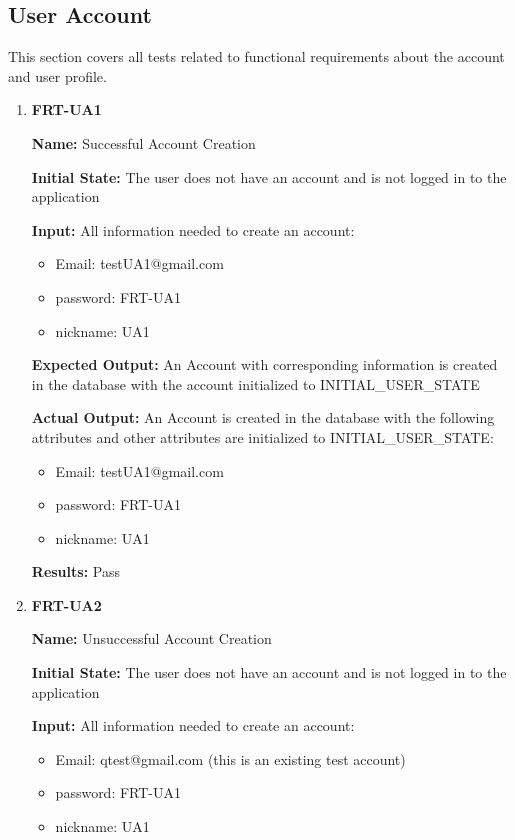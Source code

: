 \documentclass[12pt, titlepage]{article}
\begin{document}
\subsection{User Account}
This section covers all tests related to functional requirements about the account and user profile.
\begin{enumerate}
\item \textbf{FRT-UA1}

\textbf{Name:} Successful Account Creation

\textbf{Initial State:} The user does not have an account and is not logged in to the application

\textbf{Input:} All information needed to create an account:
\begin{itemize}
\item Email: testUA1@gmail.com
\item password: FRT-UA1
\item nickname: UA1
\end{itemize}
					
\textbf{Expected Output:} An Account with corresponding information is created in the database with the account initialized to INITIAL\_USER\_STATE

\textbf{Actual Output:} An Account is created in the database with the following attributes and other attributes are initialized to INITIAL\_USER\_STATE:
\begin{itemize}
\item Email: testUA1@gmail.com
\item password: FRT-UA1
\item nickname: UA1
\end{itemize}

\textbf{Results:} Pass

\item \textbf{FRT-UA2}

\textbf{Name:} Unsuccessful Account Creation

\textbf{Initial State:} The user does not have an account and is not logged in to the application

\textbf{Input:} All information needed to create an account:
\begin{itemize}
\item Email: qtest@gmail.com (this is an existing test account)
\item password: FRT-UA1
\item nickname: UA1
\end{itemize}
					

\end{enumerate}
\end{document}
